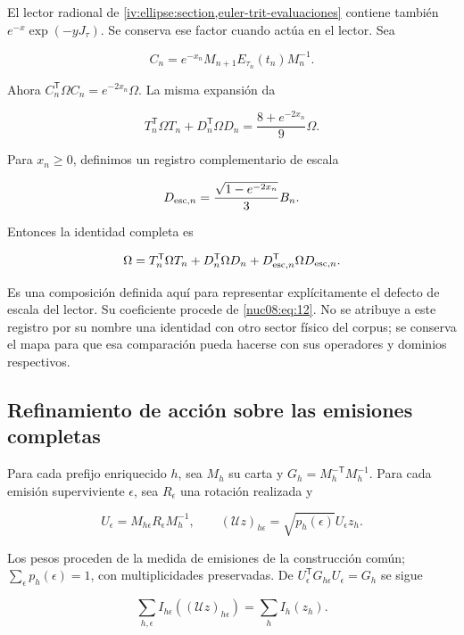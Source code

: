 El lector radional de \cref{iv:ellipse:section,euler-trit-evaluaciones} contiene también \(e^{-x}\exp(-yJ_\tau)\). Se conserva ese factor cuando actúa en el lector. Sea

\[
C_n=e^{-x_n}M_{n+1}E_{\tau_n}(t_n)M_n^{-1}.
\]

Ahora \(C_n^\mathsf T\Omega C_n=e^{-2x_n}\Omega\). La misma expansión da

\begin{equation}
T_n^\mathsf T\Omega T_n+D_n^\mathsf T\Omega D_n
=\frac{8+e^{-2x_n}}9\Omega.
\label{nuc08:eq:12}
\end{equation}

Para \(x_n\geq0\), definimos un registro complementario de escala

\[
D_{{\rm esc},n}=\frac{\sqrt{1-e^{-2x_n}}}{3}B_n.
\]

Entonces la identidad completa es

\begin{equation}
\Omega=T_n^\mathsf T\Omega T_n+D_n^\mathsf T\Omega D_n
+D_{{\rm esc},n}^\mathsf T\Omega D_{{\rm esc},n}.
\label{nuc08:eq:13}
\end{equation}

Es una composición definida aquí para representar explícitamente el defecto de escala del lector. Su coeficiente procede de \eqref{nuc08:eq:12}. No se atribuye a este registro por su nombre una identidad con otro sector físico del corpus; se conserva el mapa para que esa comparación pueda hacerse con sus operadores y dominios respectivos.

\subsection{Refinamiento de acción sobre las emisiones completas}

Para cada prefijo enriquecido \(h\), sea \(M_h\) su carta y \(G_h=M_h^{-\mathsf T}M_h^{-1}\). Para cada emisión superviviente \(\epsilon\), sea \(R_\epsilon\) una rotación realizada y

\[
U_\epsilon=M_{h\epsilon}R_\epsilon M_h^{-1},\qquad
(\mathscr U z)_{h\epsilon}=\sqrt{p_h(\epsilon)}U_\epsilon z_h.
\]

Los pesos proceden de la medida de emisiones de la construcción común; \(\sum_\epsilon p_h(\epsilon)=1\), con multiplicidades preservadas. De \(U_\epsilon^\mathsf TG_{h\epsilon}U_\epsilon=G_h\) se sigue

\begin{equation}
\sum_{h,\epsilon}I_{h\epsilon}((\mathscr U z)_{h\epsilon})
=\sum_h I_h(z_h).
\label{nuc08:eq:14}
\end{equation}

